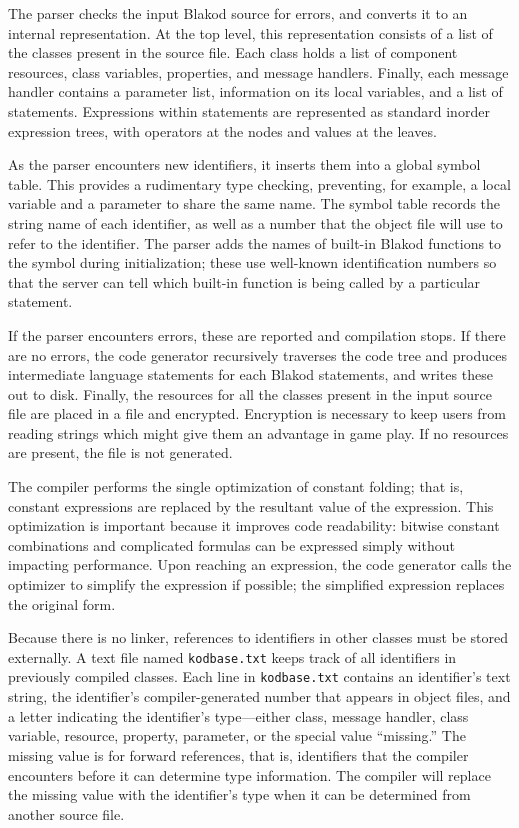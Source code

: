 The parser checks the input Blakod source for errors, and converts it
to an internal representation.  At the top level, this representation
consists of a list of the classes present in the source file.  Each
class holds a list of component resources, class variables,
properties, and message handlers.  Finally, each message handler
contains a parameter list, information on its local variables, and a
list of statements.  Expressions within statements are represented as
standard inorder expression trees, with operators at the nodes and
values at the leaves.

As the parser encounters new identifiers, it inserts them into a
global symbol table.  This provides a rudimentary type checking,
preventing, for example, a local variable and a parameter to share the
same name.  The symbol table records the string name of each
identifier, as well as a number that the object file will use to refer
to the identifier.  The parser adds the names of built-in Blakod
functions to the symbol during initialization; these use well-known
identification numbers so that the server can tell which built-in
function is being called by a particular statement.

If the parser encounters errors, these are reported and compilation
stops.  If there are no errors, the code generator recursively
traverses the code tree and produces \bof intermediate language
statements for each Blakod statements, and writes these out to disk.
Finally, the resources for all the classes present in the input source
file are placed in a \rsc file and encrypted.  Encryption is necessary
to keep users from reading strings which might give them an advantage
in game play.  If no resources are present, the \rsc file is not
generated.

The compiler performs the single optimization of constant folding;
that is, constant expressions are replaced by the resultant value of
the expression.  This optimization is important because it improves
code readability: bitwise constant combinations and complicated
formulas can be expressed simply without impacting performance.  Upon
reaching an expression, the code generator calls the optimizer to
simplify the expression if possible; the simplified expression
replaces the original form.

Because there is no linker, references to identifiers in other classes
must be stored externally.  A text file named {\tt kodbase.txt} keeps
track of all identifiers in previously compiled classes.  Each line in
{\tt kodbase.txt} contains an identifier's text string, the
identifier's compiler-generated number that appears in object files,
and a letter indicating the identifier's type---either class, message
handler, class variable, resource, property, parameter, or the special
value ``missing.''  The missing value is for forward references, that
is, identifiers that the compiler encounters before it can determine
type information.  The compiler will replace the missing value with
the identifier's type when it can be determined from another source
file.

